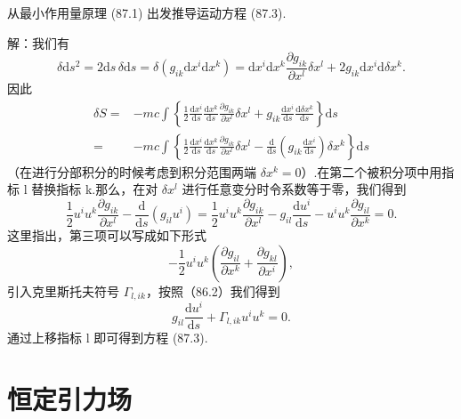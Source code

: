\begin{xiti}

\quad 从最小作用量原理 (87.1) 出发推导运动方程 (87.3).

解：我们有
\begin{equation*}
  \delta\mathrm{d}s^2=2\mathrm{d}s\,\delta\mathrm{d}s
  =\delta(g_{ik}\mathrm{d}x^i\mathrm{d}x^k)
  =\mathrm{d}x^i\mathrm{d}x^k\frac{\partial g_{ik}}{\partial x^l}\delta x^l
  +2g_{ik}\mathrm{d}x^i\mathrm{d}\delta x^k.
\end{equation*}
因此
\begin{equation*}
\begin{aligned}
  \delta S={}&-mc\int\left\{\frac{1}{2}\frac{\mathrm{d}x^i}{\mathrm{d}s}
  \frac{\mathrm{d}x^k}{\mathrm{d}s}\frac{\partial g_{ik}}{\partial x^l}\delta x^l
  +g_{ik}\frac{\mathrm{d}x^i}{\mathrm{d}s}
  \frac{\mathrm{d}\delta x^k}{\mathrm{d}s}\right\}\mathrm{d}s\\
  ={}&-mc\int\left\{\frac{1}{2}\frac{\mathrm{d}x^i}{\mathrm{d}s}
  \frac{\mathrm{d}x^k}{\mathrm{d}s}\frac{\partial g_{ik}}{\partial x^l}\delta x^l
  -\frac{\mathrm{d}}{\mathrm{d}s}\left(g_{ik}\frac{\mathrm{d}x^i}{\mathrm{d}s}\right)
  \delta x^k\right\}\mathrm{d}s
\end{aligned}
\end{equation*}
（在进行分部积分的时候考虑到积分范围两端 $\delta x^k=0$）.在第二个被积分项中用指标 l 替换指标 k.那么，在对 $\delta x^l$ 进行任意变分时令系数等于零，我们得到
\begin{equation*}
  \frac{1}{2}u^iu^k\frac{\partial g_{ik}}{\partial x^l}
  -\frac{\mathrm{d}}{\mathrm{d}s}(g_{il}u^i)
  =\frac{1}{2}u^iu^k\frac{\partial g_{ik}}{\partial x^l}
  -g_{il}\frac{\mathrm{d}u^i}{\mathrm{d}s}
  -u^iu^k\frac{\partial g_{il}}{\partial x^k}=0.
\end{equation*}
这里指出，第三项可以写成如下形式
\begin{equation*}
  -\frac{1}{2}u^iu^k\left(\frac{\partial g_{il}}{\partial x^k}
  +\frac{\partial g_{kl}}{\partial x^i}\right),
\end{equation*}
引入克里斯托夫符号 $\Gamma_{l,ik}$，按照（86.2）我们得到
\begin{equation*}
  g_{il}\frac{\mathrm{d}u^i}{\mathrm{d}s}
  +\Gamma_{l,ik}u^iu^k=0.
\end{equation*}
通过上移指标 l 即可得到方程 (87.3).

\end{xiti}

\section{恒定引力场}


